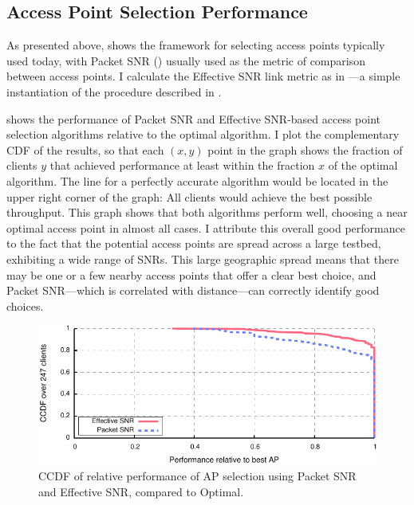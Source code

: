 \subsection{Access Point Selection Performance}
As presented above,  shows the framework for selecting access points typically used today, with Packet SNR () usually used as the metric of comparison between access points. I calculate the Effective SNR link metric as in ---a simple instantiation of the procedure described in . 

 shows the performance of Packet SNR and Effective SNR-based access point selection algorithms relative to the optimal algorithm. I plot the complementary CDF of the results, so that each $(x,y)$ point in the graph shows the fraction of clients $y$ that achieved performance at least within the fraction $x$ of the optimal algorithm. The line for a perfectly accurate algorithm would be located in the upper right corner of the graph: All clients would achieve the best possible throughput.  This graph shows that both algorithms perform well, choosing a near optimal access point in almost all cases. I attribute this overall good performance to the fact that the potential access points are spread across a large testbed, exhibiting a wide range of SNRs. This large geographic spread means that there may be one or a few nearby access points that offer a clear best choice, and Packet SNR---which is correlated with distance---can correctly identify good choices.

\begin{figure}[t]
	\centering
	\includegraphics[width=\textwidth]{figures/applications/ap_sel_ratio_opt.pdf}
	\caption[AP selection using Packet SNR or Effective SNR compared to Optimal]{\label{fig:ap_sel_ratio_opt}CCDF of relative performance of AP selection using Packet SNR and Effective SNR, compared to Optimal.}
\end{figure}

